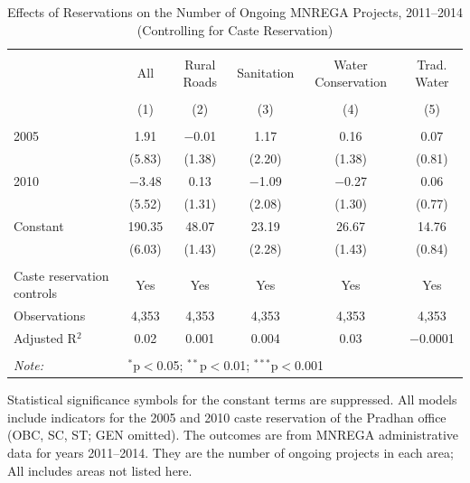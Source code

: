 \begin{table}[!htbp]
\centering
\begin{threeparttable}

  \caption{Effects of Reservations on the Number of Ongoing MNREGA Projects, 2011--2014 (Controlling for Caste Reservation)} 
  \label{main_mnrega_ongoing_caste_ctrl} 
\scriptsize 
\begin{tabular}{@{\extracolsep{0pt}}lccccc} 
\\[-1.8ex]\hline 
\hline \\[-1.8ex] 
 & All & Rural Roads & Sanitation & Water Conservation & Trad. Water \\ 
\\[-1.8ex] & (1) & (2) & (3) & (4) & (5)\\ 
\hline \\[-1.8ex] 
 2005 & 1.91 & $-$0.01 & 1.17 & 0.16 & 0.07 \\ 
  & (5.83) & (1.38) & (2.20) & (1.38) & (0.81) \\ 
  2010 & $-$3.48 & 0.13 & $-$1.09 & $-$0.27 & 0.06 \\ 
  & (5.52) & (1.31) & (2.08) & (1.30) & (0.77) \\ 
  Constant & 190.35 & 48.07 & 23.19 & 26.67 & 14.76 \\ 
  & (6.03) & (1.43) & (2.28) & (1.43) & (0.84) \\ 
 \hline \\[-1.8ex] 
Caste reservation controls & Yes & Yes & Yes & Yes & Yes \\ 
Observations & 4,353 & 4,353 & 4,353 & 4,353 & 4,353 \\ 
Adjusted R$^{2}$ & 0.02 & 0.001 & 0.004 & 0.03 & $-$0.0001 \\ 
\hline 
\hline \\[-1.8ex] 
\textit{Note:}  & \multicolumn{5}{l}{$^{*}$p$<$0.05; $^{**}$p$<$0.01; $^{***}$p$<$0.001} \\ 
\end{tabular} 
\begin{tablenotes}[flushleft]
\scriptsize
\item[] Statistical significance symbols for the constant terms are suppressed. All models include indicators for the 2005 and 2010 caste reservation of the Pradhan office (OBC, SC, ST; GEN omitted). The outcomes are from MNREGA administrative data for years 2011--2014. They are the number of ongoing projects in each area; All includes areas not listed here.
\end{tablenotes}
\end{threeparttable}
\end{table}
